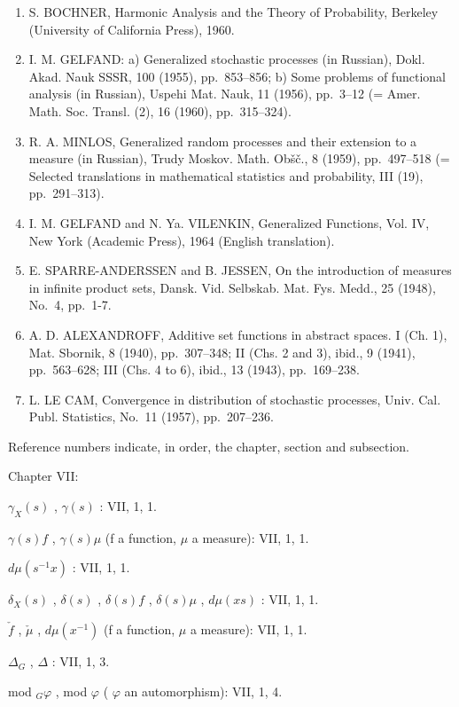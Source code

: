 \begin{enumerate}
\item
  S. BOCHNER, Harmonic Analysis and the Theory of Probability, Berkeley (University of California Press), 1960.
\item
  I. M. GELFAND: a) Generalized stochastic processes (in Russian), Dokl. Akad. Nauk SSSR, 100 (1955), pp.~853--856; b) Some problems of functional analysis (in Russian), Uspehi Mat. Nauk, 11 (1956), pp.~3--12 (= Amer. Math. Soc. Transl. (2), 16 (1960), pp.~315--324).
\item
  R. A. MINLOS, Generalized random processes and their extension to a measure (in Russian), Trudy Moskov. Math. Obšč., 8 (1959), pp.~497--518 (= Selected translations in mathematical statistics and probability, III (19), pp.~291--313).
\item
  I. M. GELFAND and N. Ya. VILENKIN, Generalized Functions, Vol. IV, New York (Academic Press), 1964 (English translation).
\item
  E. SPARRE-ANDERSSEN and B. JESSEN, On the introduction of measures in infinite product sets, Dansk. Vid. Selbskab. Mat. Fys. Medd., 25 (1948), No.~4, pp.~1-7.
\item
  A. D. ALEXANDROFF, Additive set functions in abstract spaces. I (Ch. 1), Mat. Sbornik, 8 (1940), pp.~307--348; II (Chs. 2 and 3), ibid., 9 (1941), pp.~563--628; III (Chs. 4 to 6), ibid., 13 (1943), pp.~169--238.
\item
  L. LE CAM, Convergence in distribution of stochastic processes, Univ. Cal. Publ. Statistics, No.~11 (1957), pp.~207--236.
\end{enumerate}


Reference numbers indicate, in order, the chapter, section and subsection.

Chapter VII:

\(\gamma_{X}(s)\) , \(\gamma(s)\) : VII, 1, 1.

\(\gamma(s)f\) , \(\gamma(s)\mu\) (f a function, \(\mu\) a measure): VII, 1, 1.

\(d\mu(s^{-1}x)\) : VII, 1, 1.

\(\delta_{X}(s)\) , \(\delta(s)\) , \(\delta(s)f\) , \(\delta(s)\mu\) , \(d\mu(xs)\) : VII, 1, 1.

\(\check{f}\) , \(\check{\mu}\) , \(d\mu(x^{-1})\) (f a function, \(\mu\) a measure): VII, 1, 1.

\(\Delta_{G}\) , \(\Delta\) : VII, 1, 3.

mod \(_{G}\varphi\) , mod \(\varphi\) ( \(\varphi\) an automorphism): VII, 1, 4.


